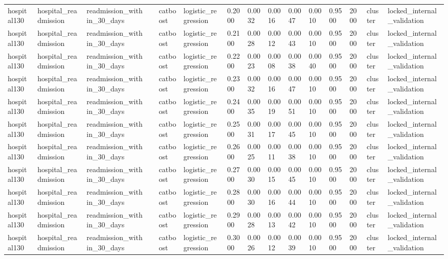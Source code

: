 \begin{tabular}{lllllllllllllll}
hospital130 & hospital\_readmission & readmission\_within\_30\_days &  & catboost & logistic\_regression & 0.2000 & 0.0032 & 0.0016 & 0.0047 & 0.0010 & 0.9500 & 2000 & cluster & locked\_internal\_validation \\
hospital130 & hospital\_readmission & readmission\_within\_30\_days &  & catboost & logistic\_regression & 0.2100 & 0.0028 & 0.0012 & 0.0043 & 0.0010 & 0.9500 & 2000 & cluster & locked\_internal\_validation \\
hospital130 & hospital\_readmission & readmission\_within\_30\_days &  & catboost & logistic\_regression & 0.2200 & 0.0023 & 0.0008 & 0.0038 & 0.0040 & 0.9500 & 2000 & cluster & locked\_internal\_validation \\
hospital130 & hospital\_readmission & readmission\_within\_30\_days &  & catboost & logistic\_regression & 0.2300 & 0.0032 & 0.0016 & 0.0047 & 0.0010 & 0.9500 & 2000 & cluster & locked\_internal\_validation \\
hospital130 & hospital\_readmission & readmission\_within\_30\_days &  & catboost & logistic\_regression & 0.2400 & 0.0035 & 0.0019 & 0.0051 & 0.0010 & 0.9500 & 2000 & cluster & locked\_internal\_validation \\
hospital130 & hospital\_readmission & readmission\_within\_30\_days &  & catboost & logistic\_regression & 0.2500 & 0.0031 & 0.0017 & 0.0045 & 0.0010 & 0.9500 & 2000 & cluster & locked\_internal\_validation \\
hospital130 & hospital\_readmission & readmission\_within\_30\_days &  & catboost & logistic\_regression & 0.2600 & 0.0025 & 0.0011 & 0.0038 & 0.0010 & 0.9500 & 2000 & cluster & locked\_internal\_validation \\
hospital130 & hospital\_readmission & readmission\_within\_30\_days &  & catboost & logistic\_regression & 0.2700 & 0.0030 & 0.0015 & 0.0045 & 0.0010 & 0.9500 & 2000 & cluster & locked\_internal\_validation \\
hospital130 & hospital\_readmission & readmission\_within\_30\_days &  & catboost & logistic\_regression & 0.2800 & 0.0030 & 0.0016 & 0.0044 & 0.0010 & 0.9500 & 2000 & cluster & locked\_internal\_validation \\
hospital130 & hospital\_readmission & readmission\_within\_30\_days &  & catboost & logistic\_regression & 0.2900 & 0.0028 & 0.0013 & 0.0042 & 0.0010 & 0.9500 & 2000 & cluster & locked\_internal\_validation \\
hospital130 & hospital\_readmission & readmission\_within\_30\_days &  & catboost & logistic\_regression & 0.3000 & 0.0026 & 0.0012 & 0.0039 & 0.0010 & 0.9500 & 2000 & cluster & locked\_internal\_validation \\

\end{tabular}

